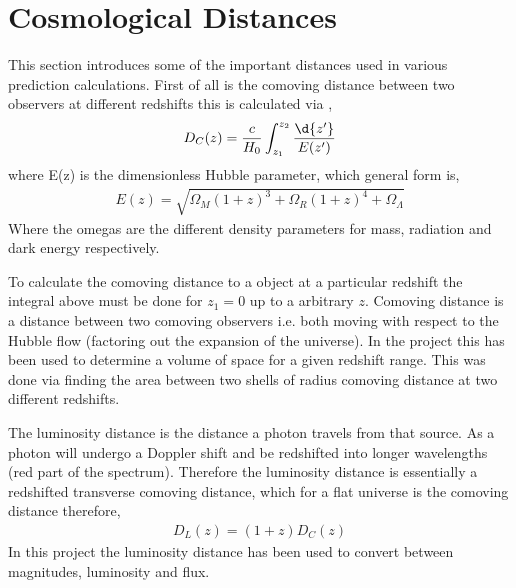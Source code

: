 
\section{Cosmological Distances} %
\label{sec:cosmological_distances}
	This section introduces some of the important distances used in various prediction calculations. First of all is the comoving distance between two observers at different redshifts this is calculated via \cite{distance_measures_cosmology},
	\begin{align}
		D_{C}(z)=\frac{c}{H_{0}}\int^{z_{2}}_{z_{1}}\frac{\d{z'}}{E(z')}
	\end{align}
	where E(z) is the dimensionless Hubble parameter, which general form is,
	\begin{align}
		E(z)=\sqrt{\Omega_{M}(1+z)^{3}+\Omega_{R}(1+z)^{4}+\Omega_{\Lambda}}
	\end{align}
	Where the omegas are the different density parameters for mass, radiation and dark energy respectively.

	To calculate the comoving distance to a object at a particular redshift the integral above must be done for $z_{1}=0$ up to a arbitrary $z$. Comoving distance is a distance between two comoving observers i.e. both moving with respect to the Hubble flow (factoring out the expansion of the universe). In the project this has been used to determine a volume of space for a given redshift range. This was done via finding the area between two shells of radius comoving distance at two different redshifts.

	The luminosity distance is the distance a photon travels from that source. As a photon will undergo a Doppler shift and be redshifted into longer wavelengths (red part of the spectrum). Therefore the luminosity distance is essentially a redshifted transverse comoving distance\cite{distance_measures_cosmology}, which for a flat universe is the comoving distance therefore,
	\begin{align}
		D_{L}(z)=(1+z)D_{C}(z)
	\end{align}
	In this project the luminosity distance has been used to convert between magnitudes, luminosity and flux.

